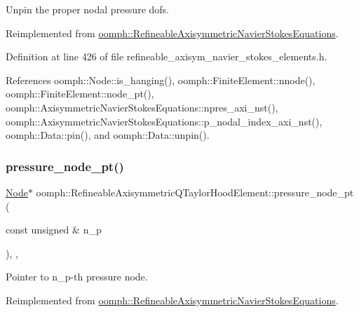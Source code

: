Unpin the proper nodal pressure dofs. 



Reimplemented from \hyperlink{classoomph_1_1RefineableAxisymmetricNavierStokesEquations_ae64d696cc2f48517adb894d9732a5d20}{oomph\+::\+Refineable\+Axisymmetric\+Navier\+Stokes\+Equations}.



Definition at line 426 of file refineable\+\_\+axisym\+\_\+navier\+\_\+stokes\+\_\+elements.\+h.



References oomph\+::\+Node\+::is\+\_\+hanging(), oomph\+::\+Finite\+Element\+::nnode(), oomph\+::\+Finite\+Element\+::node\+\_\+pt(), oomph\+::\+Axisymmetric\+Navier\+Stokes\+Equations\+::npres\+\_\+axi\+\_\+nst(), oomph\+::\+Axisymmetric\+Navier\+Stokes\+Equations\+::p\+\_\+nodal\+\_\+index\+\_\+axi\+\_\+nst(), oomph\+::\+Data\+::pin(), and oomph\+::\+Data\+::unpin().

\mbox{\label{classoomph_1_1RefineableAxisymmetricQTaylorHoodElement_a1d0228372441c2332b9fed4fd1ad44ad}} 
\subsubsection{\texorpdfstring{pressure\+\_\+node\+\_\+pt()}{pressure\_node\_pt()}}
{\footnotesize\ttfamily \hyperlink{classoomph_1_1Node}{Node}$\ast$ oomph\+::\+Refineable\+Axisymmetric\+Q\+Taylor\+Hood\+Element\+::pressure\+\_\+node\+\_\+pt (\begin{DoxyParamCaption}\item[{const unsigned \&}]{n\+\_\+p }\end{DoxyParamCaption})\hspace{0.3cm}{\ttfamily [inline]}, {\ttfamily [private]}, {\ttfamily [virtual]}}



Pointer to n\+\_\+p-\/th pressure node. 



Reimplemented from \hyperlink{classoomph_1_1RefineableAxisymmetricNavierStokesEquations_aa7fd86165c3410ed4c7ea736d6c3d976}{oomph\+::\+Refineable\+Axisymmetric\+Navier\+Stokes\+Equations}.



